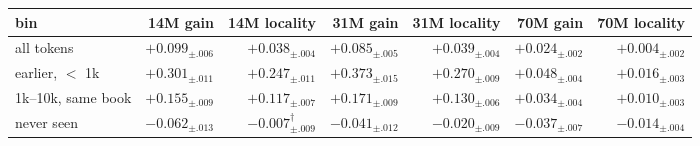 \begin{tabular}{lrrrrrr}
\toprule
bin & 14M gain & 14M locality & 31M gain & 31M locality & 70M gain & 70M locality \\
\midrule
all tokens & $+0.099_{\pm .006}$ & $+0.038_{\pm .004}$ & $+0.085_{\pm .005}$ & $+0.039_{\pm .004}$ & $+0.024_{\pm .002}$ & $+0.004_{\pm .002}$ \\
earlier, $<$ 1k & $+0.301_{\pm .011}$ & $+0.247_{\pm .011}$ & $+0.373_{\pm .015}$ & $+0.270_{\pm .009}$ & $+0.048_{\pm .004}$ & $+0.016_{\pm .003}$ \\
1k--10k, same book & $+0.155_{\pm .009}$ & $+0.117_{\pm .007}$ & $+0.171_{\pm .009}$ & $+0.130_{\pm .006}$ & $+0.034_{\pm .004}$ & $+0.010_{\pm .003}$ \\
never seen & $-0.062_{\pm .013}$ & $-0.007_{\pm .009}^{\dagger}$ & $-0.041_{\pm .012}$ & $-0.020_{\pm .009}$ & $-0.037_{\pm .007}$ & $-0.014_{\pm .004}$ \\
\bottomrule
\end{tabular}
